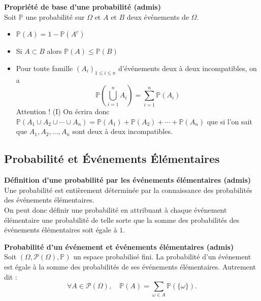 \documentclass[../PolyS4.tex]{subfiles}
\begin{document}
\begin{Prop}\textbf{Propriété de base d'une probabilité (admis)}\\

Soit $\mathbb{P}$ une probabilité sur $\Omega$ et $A$ et $B$ deux événements de $\Omega$.
\begin{itemize}
    \item[(I)] $\mathbb{P}(A) = 1 - \mathbb{P}(A^c)$
    \item[(II)] Si $A \subset B$ alors $\mathbb{P}(A) \leq \mathbb{P}(B)$
    \item[(III)] Pour toute famille $(A_i)_{1 \leq i \leq n}$ d'événements deux à deux incompatibles, on a
    \[
    \mathbb{P}\left( \bigcup_{i=1}^{n} A_i \right) = \sum_{i=1}^{n} \mathbb{P}(A_i)
    \]
    Attention ! (I) On écrira donc $\mathbb{P}(A_1 \cup A_2 \cup \cdots \cup A_n) = \mathbb{P}(A_1) + \mathbb{P}(A_2) + \cdots + \mathbb{P}(A_n)$ que si l'on sait que $A_1, A_2, \ldots, A_n$ sont deux à deux incompatibles.\\
\end{itemize}
\end{Prop}

\subsection{Probabilité et Événements Élémentaires}

\begin{Prop}\textbf{Définition d'une probabilité par les événements élémentaires (admis)}\\

Une probabilité est entièrement déterminée par la connaissance des probabilités des événements élémentaires.\\
 On peut donc définir une probabilité en attribuant à chaque événement élémentaire une probabilité de telle sorte que la somme des probabilités des événements élémentaires soit égale à $1$.\\
\end{Prop}



\begin{Prop}\textbf{Probabilité d'un événement et événements élémentaires (admis)}\\

Soit $(\Omega, \mathcal{P}(\Omega), \mathbb{P})$ un espace probabilisé fini. La probabilité d'un événement est égale à la somme des probabilités de ses événements élémentaires. Autrement dit :
\[
\forall A \in \mathcal{P}(\Omega), \quad \mathbb{P}(A) = \sum_{\omega \in A} \mathbb{P}(\{\omega\}).
\]
\end{Prop}
\end{document}
